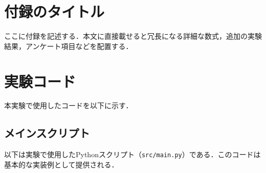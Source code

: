 \section{付録のタイトル}
ここに付録を記述する．本文に直接載せると冗長になる詳細な数式，追加の実験結果，アンケート項目などを配置する．

\section{実験コード}
本実験で使用したコードを以下に示す．

\subsection{メインスクリプト}
以下は実験で使用したPythonスクリプト（\texttt{src/main.py}）である．このコードは基本的な実装例として提供される．



% 
%
